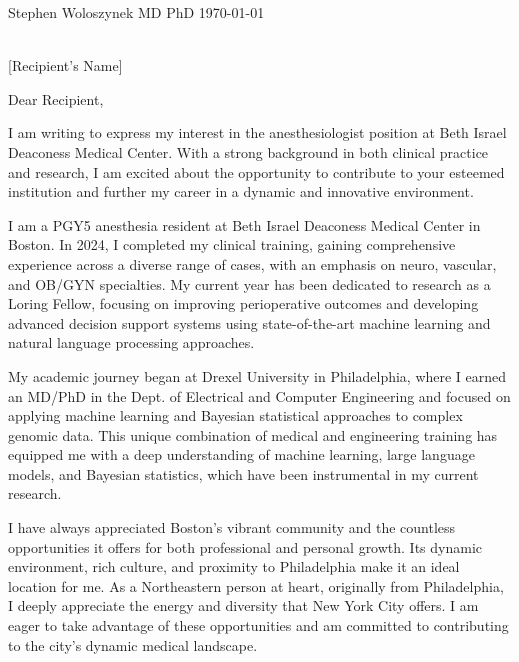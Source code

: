 \documentclass[12pt]{letter}
\newcommand{\recip}{Recipient}
\newcommand{\dept}{Dept. of Anesthesia}
\newcommand{\hosp}{Beth Israel Deaconess Medical Center}
\newcommand{\addr}{330 Brookline Ave \\ Boston, MA 02215}
\newcommand{\city}{Boston}
\begin{document}
\date{}

\begin{letter}{
\normalsize{Stephen Woloszynek MD PhD} \hfill \normalsize{\today} \\
\vspace{.1cm}
\fontsize{8.5}{10}\selectfont{
235 Old Colony Ave. Unit 224 \\
Boston, MA, 02127 \\
(215) 910-0152 \\
stephenwoloszynek@gmail.com} \\

\vspace{1cm}

\normalsize{[Recipient's Name]} \\
\vspace{.1cm}
\fontsize{8.5}{10}\selectfont{\dept \\
\hosp \\
\addr}
}

\opening{Dear \recip,}
\vspace{.2cm}
I am writing to express my interest in the anesthesiologist position at \hosp. With a strong background in both clinical practice and research, I am excited about the opportunity to contribute to your esteemed institution and further my career in a dynamic and innovative environment.

I am a PGY5 anesthesia resident at Beth Israel Deaconess Medical Center in Boston. In 2024, I completed my clinical training, gaining comprehensive experience across a diverse range of cases, with an emphasis on neuro, vascular, and OB/GYN specialties. My current year has been dedicated to research as a Loring Fellow, focusing on improving perioperative outcomes and developing advanced decision support systems using state-of-the-art machine learning and natural language processing approaches.

My academic journey began at Drexel University in Philadelphia, where I earned an MD/PhD in the Dept. of Electrical and Computer Engineering and focused on applying machine learning and Bayesian statistical approaches to complex genomic data. This unique combination of medical and engineering training has equipped me with a deep understanding of machine learning, large language models, and Bayesian statistics, which have been instrumental in my current research. 

I have always appreciated {\city}'s vibrant community and the countless opportunities it offers for both professional and personal growth. Its dynamic environment, rich culture, and proximity to Philadelphia make it an ideal location for me. As a Northeastern person at heart, originally from Philadelphia, I deeply appreciate the energy and diversity that New York City offers. I am eager to take advantage of these opportunities and am committed to contributing to the city’s dynamic medical landscape. 


\end{letter}
\end{document}
